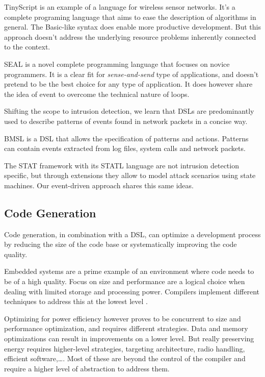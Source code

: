 \documentclass[conference]{IEEEtran}
\begin{document}
TinyScript \cite{levis2004tinyscript} is an example of a language for wireless
sensor networks. It's a complete programing language that aims to ease the
description of algorithms in general. The Basic-like syntax does enable more
productive development. But this approach doesn't address the underlying
resource problems inherently connected to the context.

SEAL \cite{elsts2013seal} is a novel complete programming language that focuses
on novice programmers. It is a clear fit for \emph{sense-and-send} type of
applications, and doesn't pretend to be the best choice for any type of
application. It does however share the idea of event to overcome the technical
nature of loops.

Shifting the scope to intrusion detection, we learn that DSLs are predominantly
used to describe patterns of events found in network
packets \cite{sekar1999high,roesch1999snort} in a concise way.

BMSL \cite{uppuluri2001experiences} is a DSL that allows the specification of
patterns and actions. Patterns can contain events extracted from log files,
system calls and network packets.

The STAT framework with its STATL
language \cite{eckmann2002statl,vigna2003designing} are not intrusion detection
specific, but through extensions they allow to model attack scenarios using
state machines. Our event-driven approach shares this same ideas.

\subsection{Code Generation}

Code generation, in combination with a DSL, can optimize a development process
by reducing the size of the code base or systematically improving the code
quality.

Embedded systems are a prime example of an environment where code needs to be
of a high quality. Focus on size and performance are a logical choice when
dealing with limited storage and processing power. Compilers implement
different techniques to address this at the lowest level \cite{leupers2000code,
marwedel2002code}.

Optimizing for power efficiency however proves to be concurrent to size and
performance optimization, and requires different strategies. Data and memory
optimizations \cite{panda2001data} can result in improvements on a lower level.
But really preserving energy requires higher-level strategies, targeting
architecture, radio handling, efficient software,\dots \cite{naik2001software}.
Most of these are beyond the control of the compiler and require a higher level
of abstraction to address them.
\end{document}
